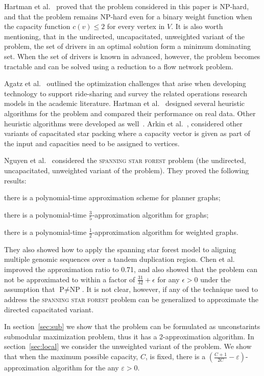 Hartman et al.~\cite{hartman2013optimal} proved that the
\emph{\CARPOOL{}} problem considered in this paper is NP-hard,
and that the problem remains NP-hard even for a binary weight function when
the capacity function $c(v) \leq 2$ for every vertex in $V$.
It is also worth mentioning, that in the undirected, uncapacitated, unweighted
variant of the problem, the set of drivers in an optimal solution
form a minimum dominating set.
When the set of drivers is known in advanced, however, the problem becomes
tractable and can be solved using a reduction to a flow network problem.

Agatz et al.~\cite{agatz2012optimization} outlined the optimization challenges
that arise when developing technology to support ride-sharing and survey the
related operations research models in the academic literature.  
Hartman et al.~\cite{hartman2014theory} designed several heuristic algorithms
for the \CARPOOL{} problem and compared 
their performance on real data.
Other heuristic algorithms were developed as well~\cite{knapen2014exploiting}.
Arkin et al.~\cite{arkin2004approximations}, considered other variants of
capacitated star packing where a capacity vector is given as part of the input and 
capacities need to be assigned to vertices.  

Nguyen et al.~\cite{nguyen2008approximating} considered the \textsc{spanning star forest} problem
(the undirected, uncapacitated, unweighted variant of the problem).
They proved the following results:
\begin{enumerate*}
\item
there is a polynomial-time approximation scheme for planner graphs;
\item 
there is a polynomial-time $\frac{3}{5}$-approximation algorithm for graphs;
\item 
there is a polynomial-time $\frac{1}{2}$-approximation algorithm for weighted graphs.
\end{enumerate*}
They also showed how to apply the spanning star forest model to aligning multiple
genomic sequences over a tandem duplication region.
Chen et al.~\cite{chen2007improved} improved the approximation ratio to 0.71,
and also showed that the problem can not be approximated to within a factor of
$\frac{31}{32} + \epsilon$ for any $\epsilon > 0$ under the assumption 
that $\text{P} \neq \text{NP}$.
It is not clear, however, if any of the technique used to address the
\textsc{spanning star forest} problem can be generalized to approximate the
directed capacitated variant.

In section~\ref{sec:sub} we show that the problem can be formulated as
unconstarints submodular maximization problem, thus it has a 2-approximation
algorithm.
In section~\ref{sec:local} we consider the unweighted variant of the problem.
We show that when the maximum possible capacity, $C$, is fixed, there is a 
$(\frac{C + 1}{2C} - \varepsilon)$-approximation algorithm for the any $\varepsilon > 0$.
